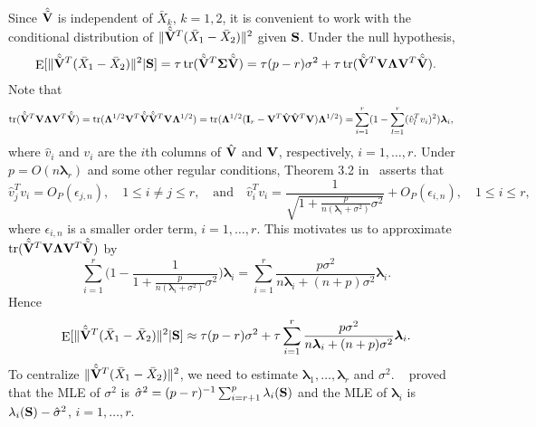 \documentclass[3p]{elsarticle}
\DeclareMathOperator{\mytr}{tr}
\DeclareMathOperator{\myE}{E}
\newcommand{\bfsym}[1]{\ensuremath{\boldsymbol{#1}}}
\def\blambda {\bfsym {\lambda}}        \def\bLambda {\bfsym {\Lambda}}
\theoremstyle{plain}
\theoremstyle{definition}
\theoremstyle{remark}
\begin{document}
Since $\hat{\tilde{\mathbf{V}}}$ is independent of $\bar{X}_k$, $k=1,2$, it is convenient to work with the conditional distribution of $\|\hat{\tilde{\mathbf{V}}}^T (\bar{X}_1-\bar{X}_2)\|^2$ given $\mathbf{S}$. 
Under the null hypothesis, 
\begin{equation*}
    \begin{aligned}
        \myE[ \|\hat{\tilde{\BV}}^T (\bar{X}_1-\bar{X}_2)\|^2 |\BS]
        =
\tau \mytr(\hat{\tilde{\BV}}^T\bSigma\hat{\tilde{\BV}})
        =
\tau (p-r) \sigma^2+
\tau \mytr(\hat{\tilde{\BV}}^T\BV \bLambda \BV^T\hat{\tilde{\BV}}).%
    \end{aligned}
\end{equation*}
Note that
\begin{equation*}
\begin{aligned}
    \mytr(\hat{\tilde{\BV}}^T\BV \bLambda \BV^T\hat{\tilde{\BV}})
=
\mytr( \bLambda^{1/2} \BV^T\hat{\tilde{\BV}}\hat{\tilde{\BV}}^T\BV \bLambda^{1/2} )
=
\mytr( \bLambda^{1/2} (\BI_r-\BV^T\hat{\BV}\hat{\BV}^T\BV) \bLambda^{1/2} )
    =&
    \sum_{i=1}^r  (1-\sum_{l=1}^r (\hat{v}_l^T v_i)^2)\blambda_i,
\end{aligned}
\end{equation*}
where $\hat{v}_i$ and $v_i$ are the $i$th columns of $\hat{\mathbf{V}}$ and $\mathbf{V}$, respectively, $i=1,\ldots, r$.
Under $p=O(n\blambda_r)$ and some other regular conditions, Theorem 3.2 in~\cite{Fan2015Asymptotics} asserts that 
\begin{equation}\label{yaofengla1}
\hat{v}_j^T v_i=O_P(\epsilon_{j,n}),\quad 1\leq i\neq j\leq r,
\quad \text{and}\quad
\hat{v}_i^T v_i=\frac{1}{\sqrt{1+ \frac{p}{n(\blambda_i+\sigma^2)}\sigma^2}}+O_P(\epsilon_{i,n}),\quad 1\leq i\leq r,
\end{equation}
where $\epsilon_{i,n}$ is a smaller order term, $i=1,\ldots, r$.
This motivates us to approximate $\mytr(\hat{\tilde{\BV}}^T\BV \bLambda \BV^T\hat{\tilde{\BV}})$
by
$$
\sum_{i=1}^r \Big(1-\frac{1}{1+\frac{p}{n(\blambda_i+\sigma^2)}\sigma^2}\Big)\blambda_i
=
\sum_{i=1}^r \frac{p\sigma^2}{n\blambda_i+(n+p)\sigma^2}\blambda_i.
$$
Hence 
$$
\myE [\|\hat{\tilde{\BV}}^T (\bar{X}_1-\bar{X}_2)\|^2|\BS]
\approx
\tau(p-r)\sigma^2 + \tau\sum_{i=1}^r \frac{p\sigma^2}{n\blambda_i+(n+p)\sigma^2}\blambda_i.
$$
To centralize $\|\hat{\tilde{\mathbf{V}}}^T (\bar{X}_1-\bar{X}_2)\|^2$, we need to estimate $\blambda_1,\ldots, \blambda_r$ and $\sigma^2$.
~\cite{Anderson1986Asymptotic} proved that the MLE of $\sigma^2$ is $\hat{\sigma}^2=(p-r)^{-1}\sum_{i=r+1}^p \lambda_i(\mathbf{S})$ and the MLE of $\blambda_i$ is $\lambda_i(\mathbf{S})-\hat{\sigma}^2$, $i=1,\ldots, r$.
\end{document}
